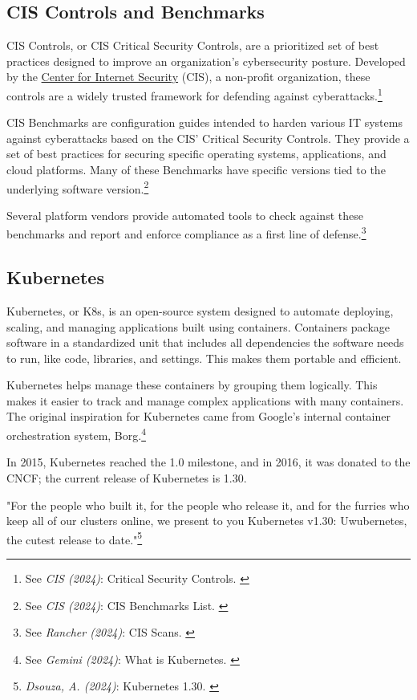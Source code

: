 \subsection{CIS Controls and Benchmarks}

CIS Controls, or CIS Critical Security Controls, are a prioritized set of best practices designed to improve an organization's cybersecurity posture. Developed by the \href{https://www.cisecurity.org/}{Center for Internet Security} (CIS), a non-profit organization, these controls are a widely trusted framework for defending against cyberattacks.\footnote{See \textit{CIS (2024)}: Critical Security Controls. \cite{cisControls}}

CIS Benchmarks are configuration guides intended to harden various IT systems against cyberattacks based on the CIS' Critical Security Controls. They provide a set of best practices for securing specific operating systems, applications, and cloud platforms. Many of these Benchmarks have specific versions tied to the underlying software version.\footnote{See \textit{CIS (2024)}: CIS Benchmarks List. \cite{cisBenchmarks}}

Several platform vendors provide automated tools to check against these benchmarks and report and enforce compliance as a first line of defense.\footnote{See \textit{Rancher (2024)}: CIS Scans. \cite{rancherBenchmarks}}

\subsection{Kubernetes}

Kubernetes, or K8s, is an open-source system designed to automate deploying, scaling, and managing applications built using containers. Containers package software in a standardized unit that includes all dependencies the software needs to run, like code, libraries, and settings. This makes them portable and efficient.

Kubernetes helps manage these containers by grouping them logically. This makes it easier to track and manage complex applications with many containers. The original inspiration for Kubernetes came from Google's internal container orchestration system, Borg.\footnote{See \textit{Gemini (2024)}: What is Kubernetes. \cite{bardKubernetes}} 

In 2015, Kubernetes reached the 1.0 milestone, and in 2016, it was donated to the CNCF; the current release of Kubernetes is 1.30.

"For the people who built it, for the people who release it, and for the furries who keep all of our clusters online, we present to you Kubernetes v1.30: Uwubernetes, the cutest release to date."\footnote{\textit{Dsouza, A. (2024)}: Kubernetes 1.30. \cite{uwubernetes}}

